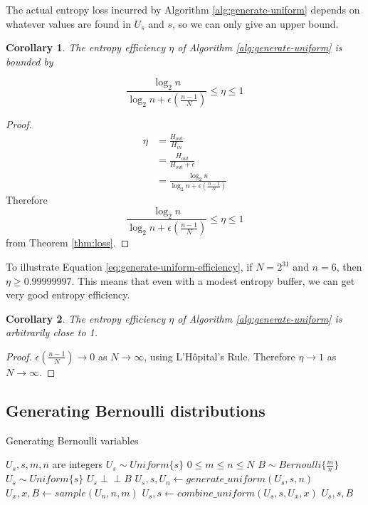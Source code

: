 \documentclass[12pt]{article}
\newtheorem{corollary}{Corollary}
\newcommand{\indep}{\perp\!\!\!\perp}
\begin{document}
The actual entropy loss incurred by Algorithm \ref{alg:generate-uniform} depends on whatever values are found in $U_s$ and $s$, so we can only give an upper bound.

\begin{corollary}
The entropy efficiency $\eta$ of Algorithm \ref{alg:generate-uniform} is bounded by

\begin{equation}
\frac{\log_2n}{\log_2n + \epsilon(\frac{n-1}{N})} \le \eta \le 1
\label{eq:generate-uniform-efficiency}
\end{equation}
\end{corollary}

\begin{proof}
\begin{align}
    \eta & = \frac{H_{out}}{H_{in}} \\
         & = \frac{H_{out}}{H_{out}+\epsilon} \\
         & = \frac{\log_2n}{\log_2n + \epsilon(\frac{n-1}{N})}
\end{align}
Therefore 
\begin{equation}
\frac{\log_2n}{\log_2n + \epsilon(\frac{n-1}{N})} \le \eta \le 1
\end{equation}
from Theorem \ref{thm:loss}.
\end{proof}

To illustrate Equation \ref{eq:generate-uniform-efficiency}, if $N=2^{31}$ and $n=6$, then $\eta \ge 0.99999997$. This means that even with a modest entropy buffer, we can get very good entropy efficiency.

\begin{corollary}
The entropy efficiency $\eta$ of Algorithm \ref{alg:generate-uniform} is arbitrarily close to 1.
\end{corollary}

\begin{proof}
$\epsilon(\frac{n-1}{N}) \rightarrow 0$ as $N \rightarrow \infty$, using L'H\^opital's Rule. Therefore $\eta \rightarrow 1$ as $N \rightarrow \infty$.
\end{proof}



\subsection{Generating Bernoulli distributions}


\begin{algorithm}
\caption{Generating Bernoulli variables}
\label{alg:generate-bernoulli}
\begin{algorithmic}[1]
\Require $U_s, s, m, n$ are integers
\Require $U_s \sim Uniform\{s\}$
\Require $0 \le m \le n\le N$
\Ensure $B \sim Bernoulli\{\frac{m}{n}\}$
\Ensure $U_s \sim Uniform\{s\}$
\Ensure $U_s \indep B$
  \State $U_s, s, U_n \gets generate\_uniform(U_s, s, n)$
  \State $U_x, x, B \gets sample(U_n, n, m)$
  \State $U_s, s \gets combine\_uniform(U_s, s, U_x, x)$
  \State \Return $U_s, s, B$
\EndProcedure
\end{algorithmic}
\end{algorithm}
\end{document}
